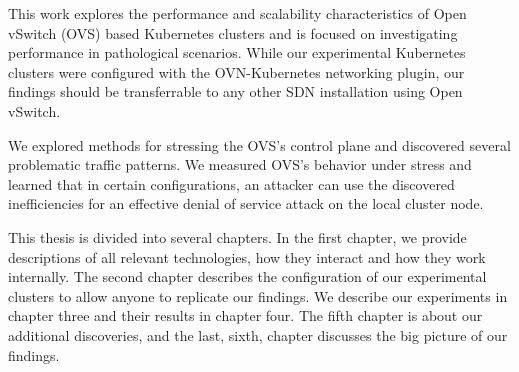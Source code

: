 This work explores the performance and scalability characteristics of Open vSwitch (OVS) based Kubernetes clusters and is focused on investigating performance in pathological scenarios. While our experimental Kubernetes clusters were configured with the OVN-Kubernetes networking plugin, our findings should be transferrable to any other SDN installation using Open vSwitch.

We explored methods for stressing the OVS's control plane and discovered several problematic traffic patterns. We measured OVS's behavior under stress and learned that in certain configurations, an attacker can use the discovered inefficiencies for an effective denial of service attack on the local cluster node.

This thesis is divided into several chapters. In the first chapter, we provide descriptions of all relevant technologies, how they interact and how they work internally. The second chapter describes the configuration of our experimental clusters to allow anyone to replicate our findings. We describe our experiments in chapter three and their results in chapter four. The fifth chapter is about our additional discoveries, and the last, sixth, chapter discusses the big picture of our findings. 



%
